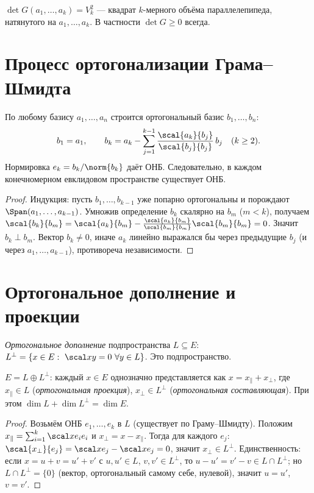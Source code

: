 \begin{remark}
$\det G(a_1,\dots,a_k)=V_k^2$ — квадрат $k$-мерного объёма параллелепипеда, натянутого на
$a_1,\dots,a_k$. В частности $\det G\ge0$ всегда.
\end{remark}

\section{Процесс ортогонализации Грама–Шмидта}

\begin{theorem}
По любому базису $a_1,\dots,a_n$ строится ортогональный базис $b_1,\dots,b_n$:
\[
  b_1=a_1,\qquad b_k=a_k-\sum_{j=1}^{k-1}\frac{\scal{a_k}{b_j}}{\scal{b_j}{b_j}}\,b_j\quad(k\ge2).
\]
Нормировка $e_k=b_k/\norm{b_k}$ даёт ОНБ. Следовательно, в каждом конечномерном евклидовом
пространстве существует ОНБ.
\end{theorem}

\begin{proof}
Индукция: пусть $b_1,\dots,b_{k-1}$ уже попарно ортогональны и порождают $\Span(a_1,\dots,a_{k-1})$.
Умножив определение $b_k$ скалярно на $b_m$ ($m<k$), получаем
$\scal{b_k}{b_m}=\scal{a_k}{b_m}-\frac{\scal{a_k}{b_m}}{\scal{b_m}{b_m}}\scal{b_m}{b_m}=0$. Значит
$b_k\perp b_m$. Вектор $b_k\ne0$, иначе $a_k$ линейно выражался бы через предыдущие $b_j$ (и через
$a_1,\dots,a_{k-1}$), противореча независимости.
\end{proof}

\section{Ортогональное дополнение и проекции}

\begin{definition}
\emph{Ортогональное дополнение} подпространства $L\subseteq E$:
$L^\perp=\{x\in E:\ \scal xy=0\ \forall y\in L\}$. Это подпространство.
\end{definition}

\begin{theorem}
$E=L\oplus L^\perp$: каждый $x\in E$ однозначно представляется как $x=x_\parallel+x_\perp$, где
$x_\parallel\in L$ (\emph{ортогональная проекция}), $x_\perp\in L^\perp$ (\emph{ортогональная
составляющая}). При этом $\dim L+\dim L^\perp=\dim E$.
\end{theorem}

\begin{proof}
Возьмём ОНБ $e_1,\dots,e_k$ в $L$ (существует по Граму–Шмидту). Положим
$x_\parallel=\sum_{i=1}^k\scal x{e_i}e_i$ и $x_\perp=x-x_\parallel$. Тогда для каждого $e_j$:
$\scal{x_\perp}{e_j}=\scal x{e_j}-\scal x{e_j}=0$, значит $x_\perp\in L^\perp$. Единственность: если
$x=u+v=u'+v'$ с $u,u'\in L$, $v,v'\in L^\perp$, то $u-u'=v'-v\in L\cap L^\perp$; но
$L\cap L^\perp=\{0\}$ (вектор, ортогональный самому себе, нулевой), значит $u=u'$, $v=v'$.
\end{proof}

